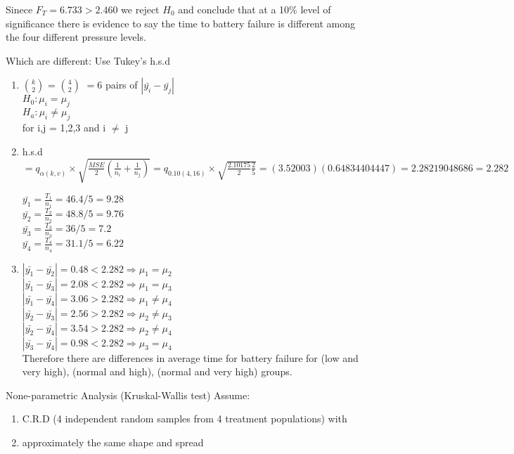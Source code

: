 \documentclass{article}
\begin{document}
Sinece $F_T = 6.733 > 2.460$ we reject $H_0$ and conclude that at a 10\% level of significance there is evidence to say the time to battery failure is different among the four different pressure levels.

Which are different: Use Tukey's h.s.d

\begin{enumerate}[1)]

\item $k \choose 2 $ = $4 \choose 2$ $= 6$ pairs of $|\bar{y_i} - \bar{y_j}|$ \\
$H_0: \mu_i = \mu_j$ \\
$H_a: \mu_i \neq \mu_j$ \\
for i,j = 1,2,3 and i $\neq$ j

\item h.s.d $ = q_{\alpha(k ,v)} \times \sqrt{ \frac{MSE}{2}( \frac{1}{n_i} + \frac{1}{n_j}) } = q_{0.10(4, 16)} \times \sqrt{ \frac{2.10175}{2}\frac{2}{5}} = (3.52003)(0.64834404447) = 2.28219048686 = 2.282 $

$\bar{y_1} = \frac{T_1}{n_1} = 46.4/5 = 9.28$\\
$\bar{y_2} = \frac{T_2}{n_2} = 48.8/5 = 9.76$\\
$\bar{y_3} = \frac{T_3}{n_3} = 36/5 = 7.2$\\
$\bar{y_4} = \frac{T_4}{n_4} = 31.1/5 = 6.22$\\

\item $| \bar{y_1} - \bar{y_2} | = 0.48 < 2.282 \Rightarrow \mu_1 = \mu_2$ \\
$| \bar{y_1} - \bar{y_3} | = 2.08 < 2.282 \Rightarrow \mu_1 = \mu_3$ \\
$| \bar{y_1} - \bar{y_4} | = 3.06 > 2.282 \Rightarrow \mu_1 \neq \mu_4$ \\
$| \bar{y_2} - \bar{y_3} | = 2.56 > 2.282 \Rightarrow \mu_2 \neq \mu_3$ \\
$| \bar{y_2} - \bar{y_4} | = 3.54 > 2.282 \Rightarrow \mu_2 \neq \mu_4$ \\
$| \bar{y_3} - \bar{y_4} | = 0.98 < 2.282 \Rightarrow \mu_3 = \mu_4$ \\

Therefore there are differences in average time for battery failure for (low and very high), (normal and high), (normal and very high) groups.

\end{enumerate}

None-parametric Analysis (Kruskal-Wallis test)
Assume:
\begin{enumerate}[1)]
\item C.R.D (4 independent random samples from 4 treatment populations) with
\item approximately the same shape and spread
\end{enumerate}
\end{document}
